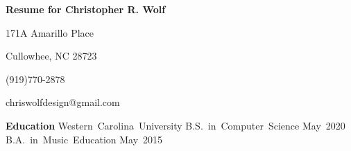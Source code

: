\documentclass[12pt]{letter}
\begin{document}
    \thispagestyle{empty} %

    \centerline{\textbf{\large Resume for Christopher R. Wolf}}
    \centerline{171A Amarillo Place}
    \centerline{Cullowhee, NC 28723}
    \centerline{(919)770-2878}
    \centerline{chriswolfdesign@gmail.com}

    \vspace{10 mm}
    \textbf{\large Education}
    \linebreak
    \hbox{Western Carolina University}
    \linebreak
    \hbox{B.S. in Computer Science} \hspace{200pt} \hbox{May 2020}
    \linebreak
    \hbox{B.A. in Music Education} \hspace{245pt} \hbox{May 2015}
\end{document}
